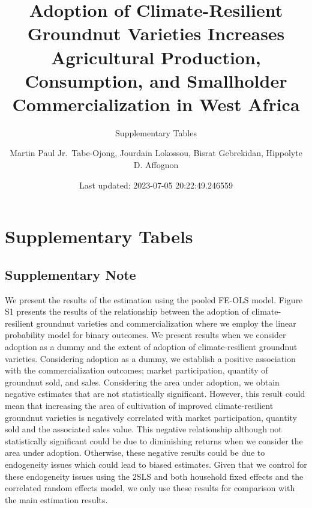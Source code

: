 \documentclass[
]{article}
\title{Adoption of Climate-Resilient Groundnut Varieties Increases Agricultural Production, Consumption, and Smallholder Commercialization in West Africa}
\subtitle{Supplementary Tables}
\author{Martin Paul Jr.~Tabe-Ojong, Jourdain Lokossou, Bisrat Gebrekidan, Hippolyte D. Affognon}
\date{Last updated: 2023-07-05 20:22:49.246559}
\begin{document}
\maketitle

\newpage
\tableofcontents
\newpage
\listoftables
\newpage

\newpage

\newpage

\hypertarget{supplementary-tabels}{%
\section{Supplementary Tabels}\label{supplementary-tabels}}

\hypertarget{supplementary-note}{%
\subsection{Supplementary Note}\label{supplementary-note}}

We present the results of the estimation using the pooled FE-OLS model. Figure S1 presents the results of the relationship between the adoption of climate-resilient groundnut varieties and commercialization where we employ the linear probability model for binary outcomes. We present results when we consider adoption as a dummy and the extent of adoption of climate-resilient groundnut varieties. Considering adoption as a dummy, we establish a positive association with the commercialization outcomes; market participation, quantity of groundnut sold, and sales. Considering the area under adoption, we obtain negative estimates that are not statistically significant. However, this result could mean that increasing the area of cultivation of improved climate-resilient groundnut varieties is negatively correlated with market participation, quantity sold and the associated sales value. This negative relationship although not statistically significant could be due to diminishing returns when we consider the area under adoption. Otherwise, these negative results could be due to endogeneity issues which could lead to biased estimates. Given that we control for these endogeneity issues using the 2SLS and both household fixed effects and the correlated random effects model, we only use these results for comparison with the main estimation results.
\end{document}

